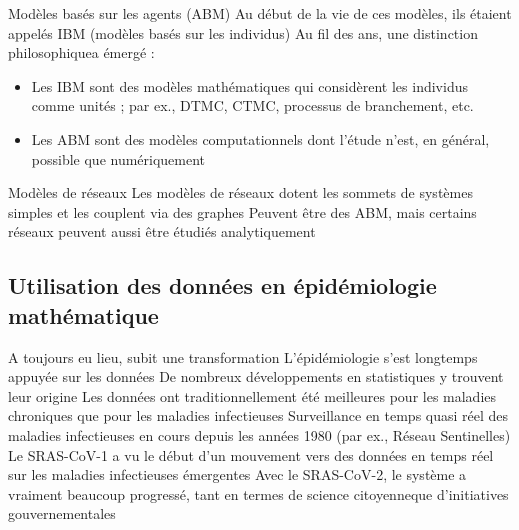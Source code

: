 \documentclass[aspectratio=169]{beamer}\usepackage[]{graphicx}\usepackage[]{xcolor}
\begin{document}
\begin{frame}{Modèles basés sur les agents (ABM)}
\bbullet Au début de la vie de ces modèles, ils étaient appelés IBM (modèles basés sur les individus)
\vfill
\bbullet Au fil des ans, une distinction \guillemetleft philosophique\guillemetright a émergé :
\begin{itemize}
\item Les IBM sont des modèles mathématiques qui considèrent les individus comme unités ; par ex., DTMC, CTMC, processus de branchement, etc.
\item Les ABM sont des modèles computationnels dont l'étude n'est, en général, possible que numériquement
\end{itemize}
\end{frame}

\begin{frame}{Modèles de réseaux}
\bbullet Les modèles de réseaux dotent les sommets de systèmes simples et les couplent via des graphes
\vfill
\bbullet Peuvent être des ABM, mais certains réseaux peuvent aussi être étudiés analytiquement
\end{frame}

\subsection{Utilisation des données en épidémiologie mathématique}


\begin{frame}{A toujours eu lieu, subit une transformation}
\bbullet L'épidémiologie s'est longtemps appuyée sur les données
\vfill
\bbullet De nombreux développements en statistiques y trouvent leur origine
\vfill
\bbullet Les données ont traditionnellement été meilleures pour les maladies chroniques que pour les maladies infectieuses
\vfill
\bbullet Surveillance en temps quasi réel des maladies infectieuses en cours depuis les années 1980 (par ex., Réseau Sentinelles)
\vfill
\bbullet Le SRAS-CoV-1 a vu le début d'un mouvement vers des données en temps réel sur les maladies infectieuses émergentes
\vfill
\bbullet Avec le SRAS-CoV-2, le système a vraiment beaucoup progressé, tant en termes de \guillemetleft science citoyenne\guillemetright que d'initiatives gouvernementales
\end{frame}



\end{document}
